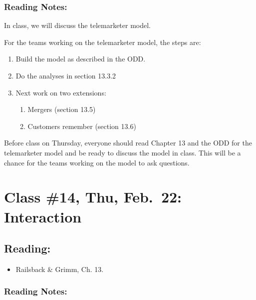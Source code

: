 \documentclass[]{article}
\providecommand{\tightlist}{%
  \setlength{\itemsep}{0pt}\setlength{\parskip}{0pt}}
\begin{document}
\hypertarget{reading-notes-11}{%
\subsubsection{Reading Notes:}\label{reading-notes-11}}

In class, we will discuss the telemarketer model.

For the teams working on the telemarketer model, the steps are:

\begin{enumerate}
\def\labelenumi{\arabic{enumi}.}
\tightlist
\item
  Build the model as described in the ODD.
\item
  Do the analyses in section 13.3.2
\item
  Next work on two extensions:

  \begin{enumerate}
  \def\labelenumii{\arabic{enumii}.}
  \tightlist
  \item
    Mergers (section 13.5)
  \item
    Customers remember (section 13.6)
  \end{enumerate}
\end{enumerate}

Before class on Thursday, everyone should read Chapter 13 and the ODD
for the telemarketer model and be ready to discuss the model in class.
This will be a chance for the teams working on the model to ask
questions.

\hypertarget{class-14-thu-feb.22-interaction}{%
\section{Class \#14, Thu, Feb.~22:
Interaction}\label{class-14-thu-feb.22-interaction}}

\hypertarget{reading-13}{%
\subsection{Reading:}\label{reading-13}}

\begin{itemize}
\tightlist
\item
  Railsback \& Grimm, Ch. 13.
\end{itemize}

\hypertarget{reading-notes-12}{%
\subsubsection{Reading Notes:}\label{reading-notes-12}}
\end{document}
